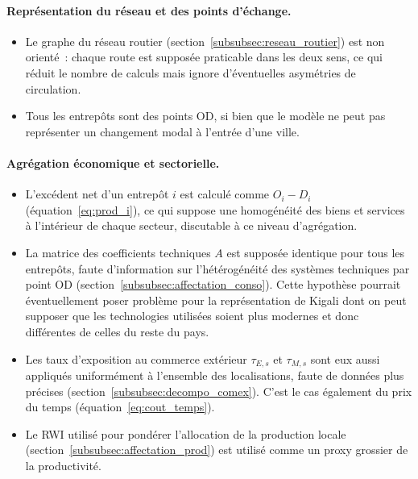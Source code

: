 \documentclass[12pt,a4paper,french]{report}
\begin{document}
	\paragraph{Représentation du réseau et des points d'échange.}
	\begin{itemize}
		\item Le graphe du réseau routier (section~\ref{subsubsec:reseau_routier}) est non orienté~: chaque route est supposée praticable dans les deux sens, ce qui réduit le nombre de calculs mais ignore d'éventuelles asymétries de circulation.
		\item Tous les entrepôts sont des points OD, si bien que le modèle ne peut pas représenter un changement modal à l'entrée d'une ville.
	\end{itemize}

	\paragraph{Agrégation économique et sectorielle.}
	\begin{itemize}
		\item L'excédent net d'un entrepôt $i$ est calculé comme $O_i - D_i$ (équation~\ref{eq:prod_i}), ce qui suppose une homogénéité des biens et services à l'intérieur de chaque secteur, discutable à ce niveau d'agrégation.
		\item La matrice des coefficients techniques $A$ est supposée identique pour tous les entrepôts, faute d'information sur l'hétérogénéité des systèmes techniques par point OD (section~\ref{subsubsec:affectation_conso}). Cette hypothèse pourrait éventuellement poser problème pour la représentation de Kigali dont on peut supposer que les technologies utilisées soient plus modernes et donc différentes de celles du reste du pays.
		\item Les taux d'exposition au commerce extérieur $\tau_{E,s}$ et $\tau_{M,s}$ sont eux aussi appliqués uniformément à l'ensemble des localisations, faute de données plus précises (section~\ref{subsubsec:decompo_comex}). C'est le cas également du prix du temps (équation~\ref{eq:cout_temps}).
		\item Le RWI utilisé pour pondérer l'allocation de la production locale (section~\ref{subsubsec:affectation_prod}) est utilisé comme un proxy grossier de la productivité.
	\end{itemize}
\end{document}
